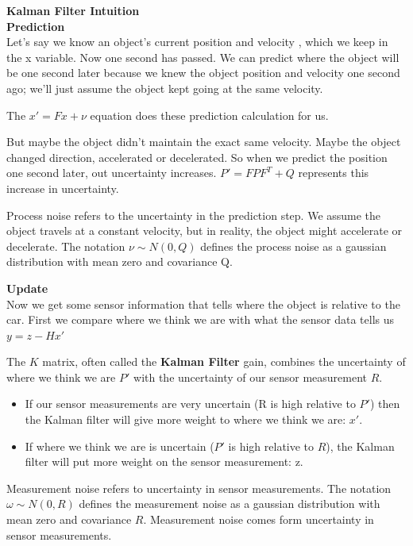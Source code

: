 \documentclass[11pt, a4paper]{article}
\begin{document}
\textbf{Kalman Filter Intuition} \\

\textbf{Prediction} \\


Let's say we know an object's current position and velocity , which we keep in the x variable. Now one second has passed. We can predict where the object will be one second later because we knew the object position and velocity one second ago; we'll just assume the object kept going at the same velocity.

The $x' = Fx + \nu$ equation does these prediction calculation for us.

But maybe the object didn't maintain the exact same velocity. Maybe the object changed direction, accelerated or decelerated. So when we predict the position one second later, out uncertainty increases. $P' = FPF^T + Q$ represents this increase in uncertainty.

Process noise refers to the uncertainty in the prediction step. We assume the object travels at a constant velocity, but in reality, the object might accelerate or decelerate. The notation $\nu 
\sim N(0,Q)$ defines the process noise as a gaussian distribution with mean zero and covariance Q.

\textbf{Update} \\

Now we get some sensor information that tells where the object is relative to the car. First we compare where we think we are with what the sensor data tells us $y = z - Hx'$


The $K$ matrix, often called the \textbf{Kalman Filter} gain, combines the uncertainty of where we think we are $P'$ with the uncertainty of our sensor measurement $R$. 

\begin{itemize}
	\item If our sensor measurements are very uncertain (R is high relative to $P'$) then the Kalman filter will give more weight to where we think we are: $x'$. 
	\item If where we think we are is uncertain ($P'$ is high relative to $R$), the Kalman filter will put more weight on the sensor measurement: z.

\end{itemize}

Measurement noise refers to uncertainty in sensor measurements. The notation $\omega \sim N(0,R)$ defines the measurement noise as a gaussian distribution with mean zero and covariance $R$. Measurement noise comes form uncertainty in sensor measurements.
\end{document}
